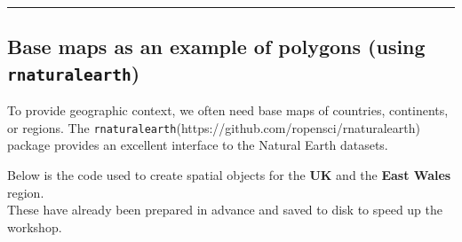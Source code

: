 \documentclass[
]{book}
\begin{document}
\begin{center}\rule{0.5\linewidth}{0.5pt}\end{center}

\subsection{\texorpdfstring{Base maps as an example of polygons (using
\texttt{rnaturalearth})}{Base maps as an example of polygons (using rnaturalearth)}}\label{base-maps-as-an-example-of-polygons-using-rnaturalearth}

To provide geographic context, we often need base maps of countries,
continents, or regions. The
\texttt{rnaturalearth}(https://github.com/ropensci/rnaturalearth)
package provides an excellent interface to the Natural Earth datasets.

Below is the code used to create spatial objects for the \textbf{UK} and
the \textbf{East Wales} region.\\
These have already been prepared in advance and saved to disk to speed
up the workshop.
\end{document}
